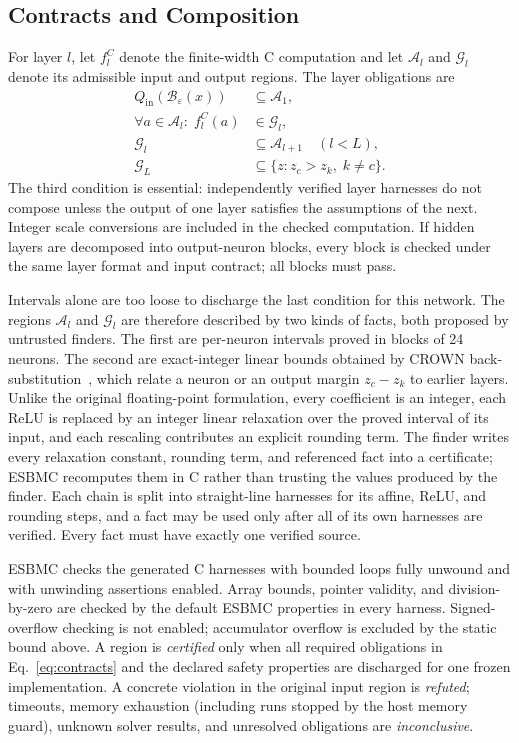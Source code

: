 \subsection{Contracts and Composition}
\label{sec:contracts}
For layer $l$, let $f_l^C$ denote the finite-width C computation and let $\mathcal{A}_l$ and $\mathcal{G}_l$ denote its admissible input and output regions. The layer obligations are
\begin{equation}
\begin{aligned}
Q_{\mathrm{in}}(\mathcal{B}_{\varepsilon}(x))&\subseteq\mathcal{A}_1, \\
\forall a\in\mathcal{A}_l:\; f_l^C(a)&\in\mathcal{G}_l, \\
\mathcal{G}_l&\subseteq\mathcal{A}_{l+1}\quad(l<L), \\
\mathcal{G}_L&\subseteq\{z:z_c>z_k,\;k\neq c\}.
\end{aligned}
\label{eq:contracts}
\end{equation}
The third condition is essential: independently verified layer harnesses do not compose unless the output of one layer satisfies the assumptions of the next. Integer scale conversions are included in the checked computation. If hidden layers are decomposed into output-neuron blocks, every block is checked under the same layer format and input contract; all blocks must pass.

Intervals alone are too loose to discharge the last condition for this network. The regions $\mathcal{A}_l$ and $\mathcal{G}_l$ are therefore described by two kinds of facts, both proposed by untrusted finders. The first are per-neuron intervals proved in blocks of 24 neurons. The second are exact-integer linear bounds obtained by CROWN back-substitution~\cite{Zhang2018CROWN}, which relate a neuron or an output margin $z_c-z_k$ to earlier layers. Unlike the original floating-point formulation, every coefficient is an integer, each ReLU is replaced by an integer linear relaxation over the proved interval of its input, and each rescaling contributes an explicit rounding term. The finder writes every relaxation constant, rounding term, and referenced fact into a certificate; ESBMC recomputes them in C rather than trusting the values produced by the finder. Each chain is split into straight-line harnesses for its affine, ReLU, and rounding steps, and a fact may be used only after all of its own harnesses are verified. Every fact must have exactly one verified source.

ESBMC checks the generated C harnesses with bounded loops fully unwound and with unwinding assertions enabled. Array bounds, pointer validity, and division-by-zero are checked by the default ESBMC properties in every harness. Signed-overflow checking is not enabled; accumulator overflow is excluded by the static bound above. A region is \emph{certified} only when all required obligations in Eq.~\eqref{eq:contracts} and the declared safety properties are discharged for one frozen implementation. A concrete violation in the original input region is \emph{refuted}; timeouts, memory exhaustion (including runs stopped by the host memory guard), unknown solver results, and unresolved obligations are \emph{inconclusive}.

